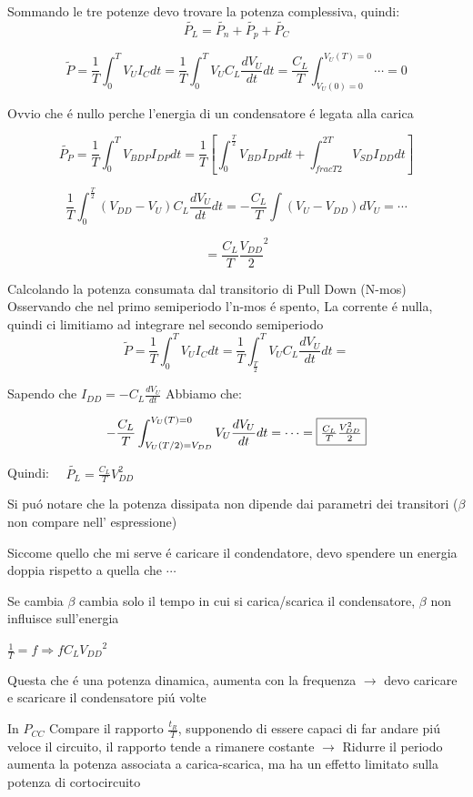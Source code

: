 \documentclass{article}
\begin{document}
Sommando le tre potenze devo trovare la potenza complessiva, quindi:
\[
    \tilde{P_L} = \tilde{P_n} + \tilde{P_p} + \tilde{P_C}
\]

\[
    \tilde{P} = \frac{1}{T}\int_0^T  V_U I_C dt = \frac{1}{T} \int_0^T V_U C_L \frac{dV_U}{dt} dt =
    \frac{C_L}{T}\int_{V_U(0)=0}^{V_U(T) = 0} \cdots = 0
\]

Ovvio che \'e nullo perche l'energia di un condensatore \'e legata alla carica

\[
    \tilde{P_P} = \frac{1}{T} \int_0^T V_{BDP} I_{DP} dt = \frac{1}{T}\left[ \int_0^{\frac{T}{2}} V_{BD} I_{DP} dt + \int_{frac{T}{2}}^{2T} V_{SD}I_{DD}dt\right]
\]


\[
    \frac{1}{T} \int_0^{\frac{T}{2}} (V_{DD} - V_U) C_L \frac{dV_U}{dt}dt = -\frac{C_L}{T} \int (V_U - V_{DD}) dV_U = \cdots
\]

\[
    =\frac{C_L}{T} \frac{V_{DD}}{2}^2
\]

Calcolando la potenza consumata dal transitorio di Pull Down (N-mos)
Osservando che nel primo semiperiodo l'n-mos \'e spento, La corrente \'e nulla, quindi ci limitiamo ad integrare nel secondo semiperiodo
\[
    \tilde{P} = \frac{1}{T}\int_0^T  V_U I_C dt = \frac{1}{T} \int_{\frac{T}{2}}^T V_U C_L \frac{dV_U}{dt} dt =
\]

Sapendo che $I_{DD} = -C_L\frac{dV_U}{dt}$ Abbiamo che:

\[
    -\frac{C_L}{T} \int_{V_U(T/2) = V_{DD}} ^ {V_U(T) = 0} V_U \frac{dV_U}{dt} dt = \cdots = \framebox{$\frac{C_L}{T} \frac{V_{DD}^2}{2}$}
\]

Quindi: $\quad \tilde{P_L} = \frac{C_L}{T} {V_{DD}^2} $

Si pu\'o notare che la potenza dissipata non dipende dai parametri dei transitori ($\beta$ non compare nell' espressione)

Siccome quello che mi serve \'e caricare il condendatore, devo spendere un energia doppia rispetto a quella che $\cdots$

Se cambia $\beta$ cambia solo il tempo in cui si carica/scarica il condensatore, $\beta$ non influisce sull'energia

$ \frac{1}{T} = f  \Rightarrow  f C_L {V_{DD}}^2$

Questa che \'e una potenza dinamica, aumenta con la frequenza $\rightarrow$ devo caricare e scaricare il condensatore pi\'u volte

In $P_{CC}$ Compare il rapporto  $\frac{t_R}{T}$, supponendo di essere capaci di far andare pi\'u veloce il circuito, il rapporto tende a rimanere costante $\rightarrow$ Ridurre il periodo aumenta la potenza associata a carica-scarica, ma ha un effetto limitato sulla potenza di cortocircuito
\end{document}
